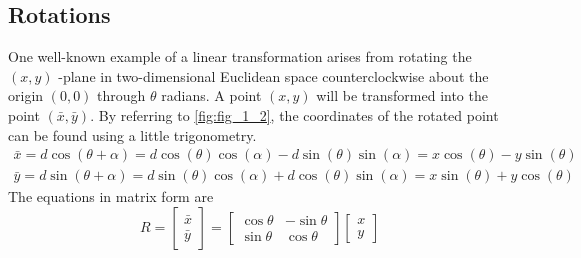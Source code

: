 \documentclass[../main.tex]{subfiles}
\begin{document}
\subsection{Rotations}
One well-known example of a linear transformation arises from rotating the $(x, y)$ -plane in two-dimensional Euclidean space counterclockwise about the origin $(0,0)$ through $\theta$ radians. A point $(x, y)$ will be transformed into the point $(\bar{x}, \bar{y}) .$ By referring to \autoref{fig:fig_1_2}, the coordinates of the rotated point can be found using a little trigonometry.
$$
\begin{array}{l}
\bar{x}=d \cos (\theta+\alpha)=d \cos (\theta) \cos (\alpha)-d \sin (\theta) \sin (\alpha)=x \cos (\theta)-y \sin (\theta) \\
\bar{y}=d \sin (\theta+\alpha)=d \sin (\theta) \cos (\alpha)+d \cos (\theta) \sin (\alpha)=x \sin (\theta)+y \cos (\theta)
\end{array}
$$
The equations in matrix form are
$$
R=\begin{bmatrix}
\bar{x} \\
\bar{y}
\end{bmatrix}=
\begin{bmatrix}
\cos \theta & -\sin \theta \\
\sin \theta & \cos \theta
\end{bmatrix}
\begin{bmatrix}
x \\
y
\end{bmatrix}
$$
\end{document}
